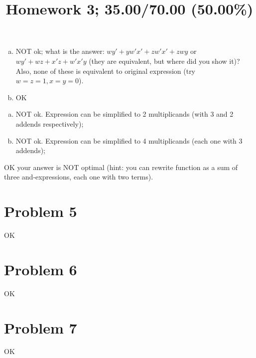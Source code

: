 \documentclass[10pt]{article} %
\title{Homework 3;
35.00/70.00 (50.00\%)
}
\begin{document}
\maketitle

\begin{enumerate}[(a)]
  \item NOT ok;
    what is the answer: $wy'+yw'x'+zw'x'+zwy$ or $wy'+wz+x'z+w'x'y$ (they are equivalent, but 
    where did you show it)?
    Also, none of these is equivalent to original expression (try $w=z=1,x=y=0$).
  \item OK
\end{enumerate}
\begin{enumerate}[(a)]
  \item NOT ok. Expression can be simplified to 2 multiplicands (with 3 and 2 addends respectively);
  \item NOT ok. Expression can be simplified to 4 multiplicands (each one with 3 addends);
\end{enumerate}
OK
your answer is NOT optimal 
(hint: you can rewrite function as a sum of three and-expressions, each
one with two terms).
\section*{Problem 5 }
OK
\section*{Problem 6 }
OK
\section*{Problem 7 }
OK
\end{document}
